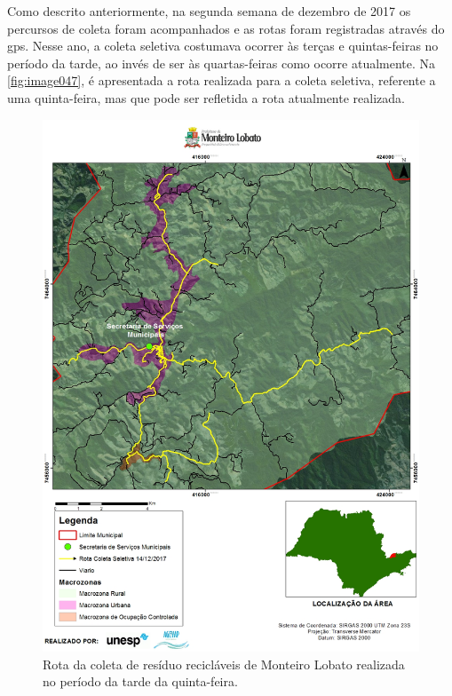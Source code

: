 	
	Como descrito anteriormente, na segunda semana de dezembro de 2017 os percursos de coleta foram acompanhados e as rotas foram registradas através do \gls{gps}. Nesse ano, a coleta seletiva costumava ocorrer às terças e quintas-feiras no período da tarde, ao invés de ser às quartas-feiras como ocorre atualmente. Na \autoref{fig:image047}, é apresentada a rota realizada para a coleta seletiva, referente a uma quinta-feira, mas que pode ser refletida a rota atualmente realizada.
	
	\begin{figure}
		\centering
		\includegraphics[width=1\linewidth]{produtos/prodtres/image047}
		\caption{Rota da coleta de resíduo recicláveis de Monteiro Lobato realizada no período da tarde da quinta-feira.}
		\label{fig:image047}
	\end{figure}
	
